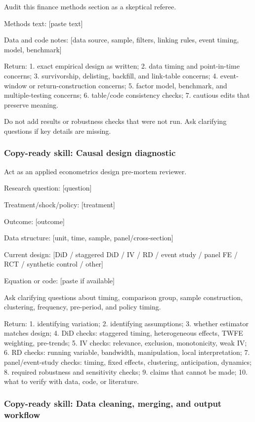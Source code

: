\documentclass[11pt]{article}
\newcommand{\skill}[1]{\subsubsection*{Copy-ready skill: #1}}
\begin{document}
\begin{promptblock}
Audit this finance methods section as a skeptical referee.

Methods text:
[paste text]

Data and code notes:
[data source, sample, filters, linking rules, event timing, model, benchmark]

Return:
1. exact empirical design as written;
2. data timing and point-in-time concerns;
3. survivorship, delisting, backfill, and link-table concerns;
4. event-window or return-construction concerns;
5. factor model, benchmark, and multiple-testing concerns;
6. table/code consistency checks;
7. cautious edits that preserve meaning.

Do not add results or robustness checks that were not run. Ask clarifying
questions if key details are missing.
\end{promptblock}

\skill{Causal design diagnostic}

\begin{promptblock}
Act as an applied econometrics design pre-mortem reviewer.

Research question:
[question]

Treatment/shock/policy:
[treatment]

Outcome:
[outcome]

Data structure:
[unit, time, sample, panel/cross-section]

Current design:
[DiD / staggered DiD / IV / RD / event study / panel FE / RCT / synthetic control / other]

Equation or code:
[paste if available]

Ask clarifying questions about timing, comparison group, sample construction,
clustering, frequency, pre-period, and policy timing.

Return:
1. identifying variation;
2. identifying assumptions;
3. whether estimator matches design;
4. DiD checks: staggered timing, heterogeneous effects, TWFE weighting, pre-trends;
5. IV checks: relevance, exclusion, monotonicity, weak IV;
6. RD checks: running variable, bandwidth, manipulation, local interpretation;
7. panel/event-study checks: timing, fixed effects, clustering, anticipation, dynamics;
8. required robustness and sensitivity checks;
9. claims that cannot be made;
10. what to verify with data, code, or literature.
\end{promptblock}

\skill{Data cleaning, merging, and output workflow}
\end{document}
